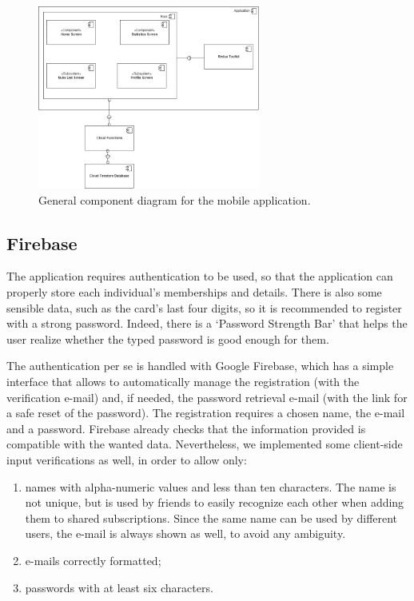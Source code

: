 \documentclass[11pt]{article}
\begin{document}
\begin{figure}[h!]
    \begin{center}
        \includegraphics[width=0.65\textwidth, clip]{../../assets/generalComponent.drawio.png}
    \end{center}
    \caption{General component diagram for the mobile application.}
    \label{fig:componentGen}
\end{figure}
\vspace{0.5cm}

\subsection{Firebase}
The application requires authentication to be used, so that the application can properly store each individual's memberships and details. There is also some sensible data, such as the card's last four digits, so it is recommended to register with a strong password. Indeed, there is a `Password Strength Bar' that helps the user realize whether the typed password is good enough for them.

The authentication per se is handled with Google Firebase, which has a simple interface that allows to automatically manage the registration (with the verification e-mail) and, if needed, the password retrieval e-mail (with the link for a safe reset of the password). The registration requires a chosen name, the e-mail and a password. Firebase already checks that the information provided is compatible with the wanted data. Nevertheless, we implemented some client-side input verifications as well, in order to allow only:
\begin{enumerate}
    \item names with alpha-numeric values and less than ten characters. The name is not unique, but is used by friends to easily recognize each other when adding them to shared subscriptions. Since the same name can be used by different users, the e-mail is always shown as well, to avoid any ambiguity.
    \item e-mails correctly formatted;
    \item passwords with at least six characters.
\end{enumerate}
\end{document}
